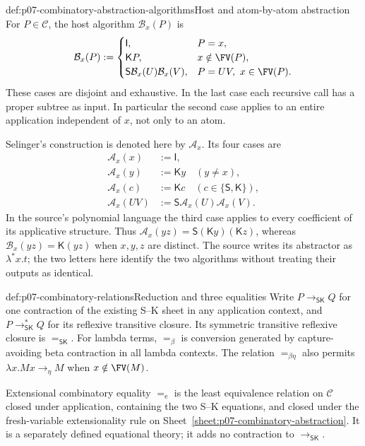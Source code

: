 \begin{hbdefinition}{def:p07-combinatory-abstraction-algorithms}{Host and atom-by-atom abstraction}
For \(P\in\mathcal C\), the host algorithm \(\mathcal B_x(P)\) is
\[
\mathcal B_x(P):=
\begin{cases}
 \mathsf I,&P=x,\\
 \mathsf K P,&x\notin\FV(P),\\
 \mathsf S\mathcal B_x(U)\mathcal B_x(V),&P=UV,
                    \ x\in\FV(P).
\end{cases}
\]
These cases are disjoint and exhaustive.  In the last case each recursive call
has a proper subtree as input.  In particular the second case applies to an
entire application independent of \(x\), not only to an atom.

Selinger's construction is denoted here by \(\mathcal A_x\).  Its four cases are
\[
\begin{aligned}
 \mathcal A_x(x)&:=\mathsf I,\\
 \mathcal A_x(y)&:=\mathsf K y\quad(y\ne x),\\
 \mathcal A_x(c)&:=\mathsf K c\quad(c\in\{\mathsf S,\mathsf K\}),\\
 \mathcal A_x(UV)&:=\mathsf S\mathcal A_x(U)\mathcal A_x(V).
\end{aligned}
\]
In the source's polynomial language the third case applies to every coefficient
of its applicative structure.  Thus \(\mathcal A_x(yz)=
\mathsf S(\mathsf K y)(\mathsf K z)\), whereas
\(\mathcal B_x(yz)=\mathsf K(yz)\) when \(x,y,z\) are distinct.
The source writes its abstractor as \(\lambda^*x.t\); the two letters here
identify the two algorithms without treating their outputs as identical.
\end{hbdefinition}

\begin{hbdefinition}{def:p07-combinatory-relations}{Reduction and three equalities}
Write \(P\longrightarrow_{\mathsf{SK}}Q\) for one contraction of the existing
S--K sheet in any application context, and
\(P\longrightarrow_{\mathsf{SK}}^*Q\) for its reflexive transitive closure.
Its symmetric transitive reflexive closure is \(=_{\mathsf{SK}}\).
For lambda terms, \(=_\beta\) is conversion generated by capture-avoiding
beta contraction in all lambda contexts.  The relation \(=_{\beta\eta}\)
also permits \(\lambda x.Mx\longrightarrow_\eta M\) when
\(x\notin\FV(M)\).

Extensional combinatory equality \(=_{\mathrm e}\) is the least equivalence
relation on \(\mathcal C\) closed under application, containing the two S--K
equations, and closed under the fresh-variable extensionality rule on
Sheet~\ref{sheet:p07-combinatory-abstraction}.  It is a separately defined
equational theory; it adds no contraction to
\(\longrightarrow_{\mathsf{SK}}\).
\end{hbdefinition}

